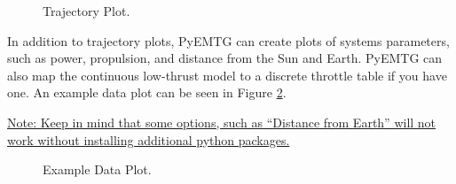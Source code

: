 \documentclass[11pt]{article}
\makeatletter
\newcommand{\knownissuelabel}[2]
{
	 \phantomsection
  	\hyperref[#2_h]{#1}\def\@currentlabel{\unexpanded{#1}}\label{#2_b}
}
\makeatother
\begin{document}
\begin{figure}[H]
	\centering
	\caption{\label{fig:traj_plot}Trajectory Plot.}
\end{figure}

\noindent In addition to trajectory plots, PyEMTG can create plots of systems parameters, such as power, propulsion, and distance from the Sun and Earth. PyEMTG can also map the continuous low-thrust model to a discrete throttle table if you have one. An example data plot can be seen in Figure \ref{fig:example_data_plot}. 

\noindent \knownissuelabel{Note: Keep in mind that some options, such as ``Distance from Earth'' will not work without installing additional python packages.}{plotting_python_packages_issue}

\begin{figure}[H]
	\centering
	\caption{\label{fig:example_data_plot}Example Data Plot.}
\end{figure}
\end{document}
